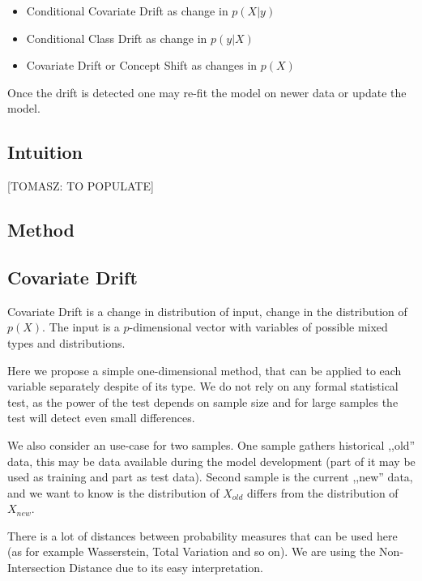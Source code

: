 \documentclass[12pt,]{krantz}
\providecommand{\tightlist}{%
  \setlength{\itemsep}{0pt}\setlength{\parskip}{0pt}}
\begin{document}
\begin{itemize}
\tightlist
\item
  Conditional Covariate Drift as change in \(p(X | y)\)
\item
  Conditional Class Drift as change in \(p(y | X)\)
\item
  Covariate Drift or Concept Shift as changes in \(p(X)\)
\end{itemize}

Once the drift is detected one may re-fit the model on newer data or update the model.

\hypertarget{DriftIntuition}{%
\subsection{Intuition}\label{DriftIntuition}}

{[}TOMASZ: TO POPULATE{]}

\hypertarget{DriftMethod}{%
\subsection{Method}\label{DriftMethod}}

\hypertarget{covariate-drift}{%
\subsection{Covariate Drift}\label{covariate-drift}}

Covariate Drift is a change in distribution of input, change in the distribution of \(p(X)\). The input is a \(p\)-dimensional vector with variables of possible mixed types and distributions.

Here we propose a simple one-dimensional method, that can be applied to each variable separately despite of its type. We do not rely on any formal statistical test, as the power of the test depends on sample size and for large samples the test will detect even small differences.

We also consider an use-case for two samples. One sample gathers historical ,,old'' data, this may be data available during the model development (part of it may be used as training and part as test data). Second sample is the current ,,new'' data, and we want to know is the distribution of \(X_{old}\) differs from the distribution of \(X_{new}\).

There is a lot of distances between probability measures that can be used here (as for example Wasserstein, Total Variation and so on). We are using the Non-Intersection Distance due to its easy interpretation.
\end{document}
